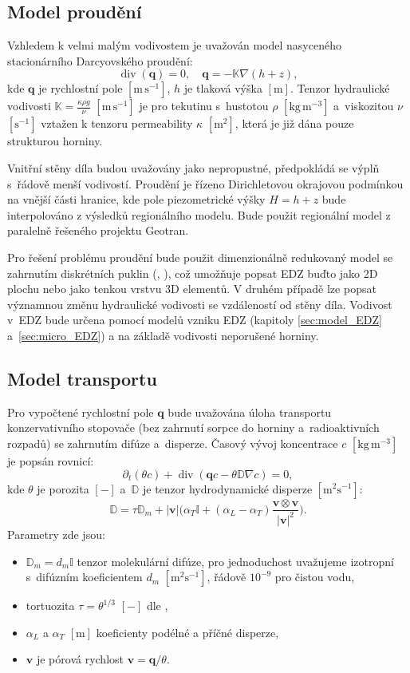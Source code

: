 \documentclass{article}
\def\abs#1{\lvert#1\rvert}
\def\prtl{\partial}
\def\unit#1{\mathrm{#1}}
\def\grad{\nabla}
\def\div{\operatorname{div}}
\def\vc#1{\mathbf{\boldsymbol{#1}}}     %
\def\tn#1{{\mathbb{#1}}}    %
\begin{document}

\subsection{Model proudění}
\label{sec:transport_flow}
Vzhledem k velmi malým vodivostem je uvažován model nasyceného stacionárního Darcyovského proudění:
\[
    \div(\vc q) = 0, \quad \vc q = -\tn K \grad (h + z),
\]
kde $\vc q$ je rychlostní pole $[\unit{m\,s^{-1}}]$, $h$ je tlaková výška $[\unit{m}]$. Tenzor hydraulické vodivosti $\tn K =\frac{\kappa \rho g}{\nu}$
 $[\unit{m\,s^{-1}}]$ je pro tekutinu s~hustotou $\rho$ $[\unit{kg\, m^{-3}}]$ a~viskozitou $\nu$ $[\unit{s^{-1}}]$ vztažen k tenzoru permeability $\kappa$ $[\unit{m^2}]$, která je již dána pouze strukturou horniny.
 
Vnitřní stěny díla budou uvažovány jako nepropustné, předpokládá se výplň s~řádově menší vodivostí. 
Proudění je řízeno Dirichletovou okrajovou podmínkou na vnější části hranice, kde pole piezometrické výšky $H = h + z$ 
bude interpolováno z výsledků regionálního modelu. Bude použit regionální model z paralelně řešeného projektu Geotran.

Pro řešení problému proudění bude použit dimenzionálně redukovaný model se zahrnutím diskrétních puklin (\cite{brezina_analysis_2015}, \cite{flow123d}),
což umožňuje popsat EDZ buďto jako 2D plochu nebo jako tenkou vrstvu 3D elementů.
V druhém případě lze popsat významnou změnu hydraulické vodivosti se vzdáleností od stěny díla.
Vodivost v~EDZ bude určena pomocí modelů vzniku EDZ (kapitoly \ref{sec:model_EDZ} a~\ref{sec:micro_EDZ}) 
a na základě vodivosti neporušené horniny.



\subsection{Model transportu}
\label{sec:stopovac}
Pro vypočtené rychlostní pole $\vc q$ bude uvažována úloha transportu konzervativního stopovače (bez zahrnutí sorpce do horniny a~radioaktivních rozpadů) 
se zahrnutím difúze a~disperze. Časový vývoj koncentrace $c$ $[\unit{kg\, m^{-3}}]$ je popsán rovnicí:
\[
   \prtl_t (\theta c) + \div( \vc q c - \theta \tn D \grad c) = 0,
\]
kde $\theta$ je porozita $[-]$ a~$\tn D$ je tenzor hydrodynamické disperze $[\unit{m^2s^{-1}}]$:
\[
  \tn D = \tau\tn D_m + \abs{\vc v}\Big(\alpha_T \tn I + (\alpha_L - \alpha_T)\frac{\vc v \otimes \vc v}{\abs{\vc v}^2}\Big).
\]
Parametry zde jsou:
\begin{itemize}
 \item $\tn D_m = d_m \tn I$ tenzor molekulární difúze, pro jednoduchost uvažujeme izotropní s~difúzním koeficientem $d_m$ $[\unit{m^2s^{-1}}]$, řádově $10^{-9}$ pro čistou vodu,
 \item tortuozita $\tau=\theta^{1/3}$ $[-]$ dle \cite{millington_quirk},
 \item $\alpha_L$ a $\alpha_T$ $[\unit{m}]$ koeficienty podélné a příčné disperze,
 \item $\vc v$ je pórová rychlost $\vc v = \vc q / \theta$.
\end{itemize}
\end{document}
